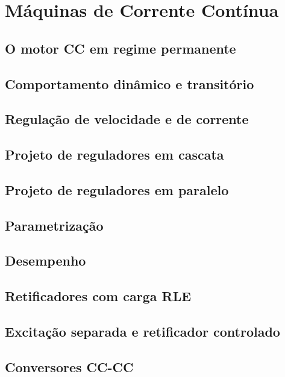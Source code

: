 \section{Máquinas de Corrente Contínua}



\subsection{O motor CC em regime permanente}


 
\subsection{Comportamento dinâmico e transitório}



\subsection{Regulação de velocidade e de corrente}



\subsection{Projeto de reguladores em cascata}
 

 
\subsection{Projeto de reguladores em paralelo}



\subsection{Parametrização}



\subsection{Desempenho}


 
\subsection{Retificadores com carga RLE}


 
\subsection{Excitação separada e retificador controlado}


 
\subsection{Conversores CC-CC}



